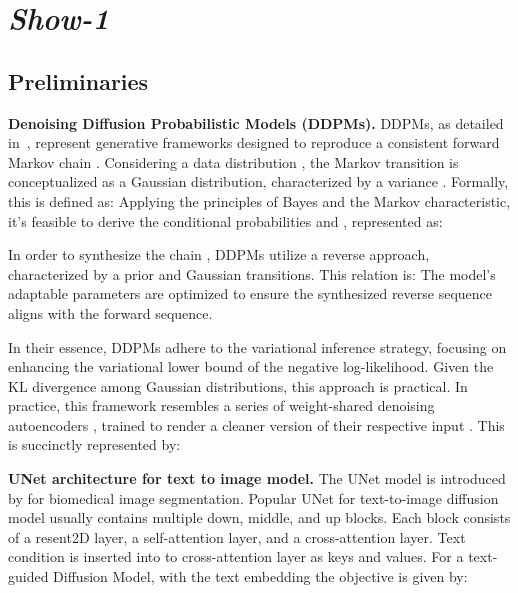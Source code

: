 \documentclass{article} \usepackage{iclr2024_conference,times}
\begin{document}
\vspace{-3mm}

\section{\textit{Show-1}}
\subsection{Preliminaries}

\noindent\textbf{Denoising Diffusion Probabilistic Models (DDPMs).} DDPMs, as detailed in~\citep{ho2020denoising}, represent generative frameworks designed to reproduce a consistent forward Markov chain . 
Considering a data distribution  , the Markov transition  is conceptualized as a Gaussian distribution, characterized by a variance . Formally, this is defined as:
{\small
}Applying the principles of Bayes and the Markov characteristic, it's feasible to derive the conditional probabilities  and , represented as:
{\small

}

  
In order to synthesize the chain , DDPMs utilize a reverse approach, characterized by a prior  and Gaussian transitions. This relation is:
{\small
}The model's adaptable parameters  are optimized to ensure the synthesized reverse sequence aligns with the forward sequence.

In their essence, DDPMs adhere to the variational inference strategy, focusing on enhancing the variational lower bound of the negative log-likelihood. Given the KL divergence among Gaussian distributions, this approach is practical. In practice, this framework resembles a series of weight-shared denoising autoencoders , trained to render a cleaner version of their respective input . This is succinctly represented by: 

\noindent\textbf{UNet architecture for text to image model.}
The UNet model is introduced by \citep{2015u} for biomedical image segmentation. Popular UNet for text-to-image diffusion model usually contains multiple down, middle, and up blocks. Each block consists of a resent2D layer, a self-attention layer, and a cross-attention layer. Text condition  is inserted into to cross-attention layer as keys and values. For a text-guided Diffusion Model, with the text embedding   the objective is given by:
\end{document}
